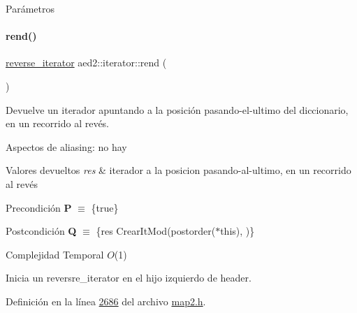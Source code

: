 \begin{DoxyParams}{\-Parámetros}
\begin{DoxyCompactItemize}
\paragraph{\texorpdfstring{rend()}{rend()}\hspace{0.1cm}{\footnotesize\ttfamily [1/2]}}
{\footnotesize\ttfamily \hyperlink{classaed2_1_1iterator_a07b2c0fa31611e03cd019b290acd6d80_a07b2c0fa31611e03cd019b290acd6d80}{reverse\+\_\+iterator} aed2\+::iterator\+::rend (\begin{DoxyParamCaption}{ }\end{DoxyParamCaption})\hspace{0.3cm}{\ttfamily [inline]}}



Devuelve un iterador apuntando a la posición pasando-\/el-\/ultimo del diccionario, en un recorrido al revés. 

\begin{DoxyParagraph}{Aspectos de aliasing\+:}
no hay
\end{DoxyParagraph}

\begin{DoxyRetVals}{Valores devueltos}
{\em res} & iterador a la posicion pasando-\/al-\/ultimo, en un recorrido al revés\\
\hline
\end{DoxyRetVals}
\begin{DoxyPrecond}{Precondición}
{\bfseries P} $\equiv$ \{true\} 
\end{DoxyPrecond}
\begin{DoxyPostcond}{Postcondición}
{\bfseries Q} $\equiv$ \{res  Crear\+It\+Mod(postorder($\ast$this),  )\}
\end{DoxyPostcond}

\begin{DoxyDescription}
\item[Complejidad Temporal]$O$(1)
\end{DoxyDescription}

Inicia un reversre\+\_\+iterator en el hijo izquierdo de header. 

Definición en la línea \hyperlink{map2_8h_source_l02686}{2686} del archivo \hyperlink{map2_8h_source}{map2.\+h}.

\mbox{\label{classaed2_1_1iterator_ad7d43d936bf4f3957f590723e9029132_ad7d43d936bf4f3957f590723e9029132}} 

\end{DoxyCompactItemize}
\end{DoxyParams}
